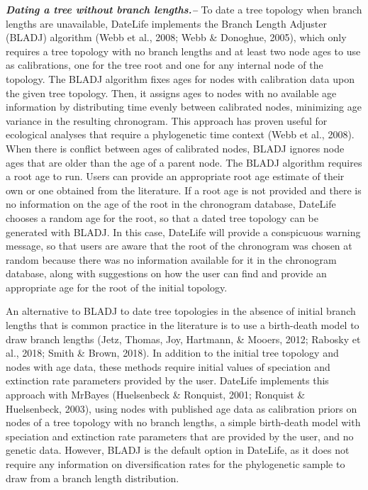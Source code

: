 \documentclass[english,man]{apa6}
\begin{document}
\textbf{\emph{Dating a tree without branch lengths.--}}
To date a tree topology when branch lengths are unavailable, DateLife implements the Branch Length Adjuster (BLADJ) algorithm (Webb et al., 2008; Webb \& Donoghue, 2005), which only requires a tree topology with no branch lengths and at least two node ages to use as calibrations, one for the tree root and one for any internal node of the topology.
The BLADJ algorithm fixes ages for nodes with calibration data upon the given tree topology. Then, it assigns ages to nodes with no available age information by distributing time evenly between calibrated nodes, minimizing age variance in the resulting chronogram.
This approach has proven useful for ecological analyses that require a phylogenetic time context (Webb et al., 2008).
When there is conflict between ages of calibrated nodes, BLADJ ignores node ages that are older than the age of a parent node.
The BLADJ algorithm requires a root age to run. Users can provide an appropriate root age estimate of their own or one obtained from the literature. If a root age is not provided and there is no information on the age of the root in the chronogram database, DateLife chooses a random age for the root, so that a dated tree topology can be generated with BLADJ. In this case, DateLife will provide a conspicuous warning message, so that users are aware that the root of the chronogram was chosen at random because there was no information available for it in the chronogram database, along with suggestions on how the user can find and provide an appropriate age for the root of the initial topology.

An alternative to BLADJ to date tree topologies in the absence of initial branch lengths that is common practice in the literature is to use a birth-death model to draw branch lengths (Jetz, Thomas, Joy, Hartmann, \& Mooers, 2012; Rabosky et al., 2018; Smith \& Brown, 2018). In addition to the initial tree topology and nodes with age data, these methods require initial values of speciation and extinction rate parameters provided by the user. DateLife implements this approach with MrBayes (Huelsenbeck \& Ronquist, 2001; Ronquist \& Huelsenbeck, 2003), using nodes with published age data as calibration priors on nodes of a tree topology with no branch lengths, a simple birth-death model with speciation and extinction rate parameters that are provided by the user, and no genetic data. However, BLADJ is the default option in DateLife, as it does not require any information on diversification rates for the phylogenetic sample to draw from a branch length distribution.
\end{document}
